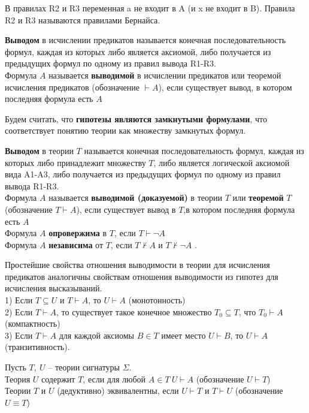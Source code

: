В правилах R2 и R3 переменная a не входит в A (и x не входит в B). Правила R2 и R3 называются правилами Бернайса.
\begin{definition}
    \textbf{Выводом} в исчислении предикатов называется конечная
    последовательность формул, каждая из которых либо является аксиомой, либо получается из предыдущих формул по одному из правил вывода R1-R3.\\
    Формула $A$ называется \textbf{выводимой} в исчислении предикатов или теоремой исчисления предикатов (обозначение $\vdash A$), если существует вывод, в котором последняя формула есть $A$ \label{formula9}
\end{definition}
Будем считать, что \textbf{гипотезы являются замкнутыми формулами}, что соответствует понятию теории как множеству замкнутых формул.
\begin{definition}
    \textbf{Выводом} в теории $T$ называется конечная последовательность формул, каждая из которых либо принадлежит множеству $T$, либо является логической аксиомой вида A1-A3, либо получается из предыдущих формул по одному из правил вывода R1-R3.\\
    Формула $A$ называется \textbf{выводимой (доказуемой)} в теории $T$ или \textbf{теоремой} $T$ (обозначение $T \vdash A$), если существует вывод в $T$,в котором последняя формула есть $A$ \label{formula10} \\ 
    Формула $A$ \textbf{опровержима} в $T$, если $T \vdash \neg A$\\
    Формула $A$ \textbf{независима} от $T$, если $T \nvdash A$ и $T \nvdash \neg A$ .
\end{definition}
Простейшие свойства отношения выводимости в теории для исчисления предикатов аналогичны свойствам отношения выводимости из гипотез для исчисления высказываний.\\
1) Если $T \subseteq U$ и $T \vdash A$, то $U \vdash A$ (монотонность)\\
2) Если $T \vdash A$, то существует такое конечное множество $T_0 \subseteq T$, что $T_0 \vdash A$ (компактность)\\
3) Если $T \vdash A$ для каждой аксиомы $B \in T$ имеет место $U \vdash B$, то $U \vdash A$ (транзитивность).
\begin{definition}
    Пусть $T, \ U$ -- теории сигнатуры $\Sigma$.\\
    Теория $U$ содержит $T$, если для любой $A\in T\: U \vdash A$ (обозначение $U \vdash T$)\\
    Теории $T$ и $U$ (дедуктивно) эквивалентны, если   $U \vdash T$ и $T \vdash U$ (обозначение $U \equiv T$)
\end{definition}
